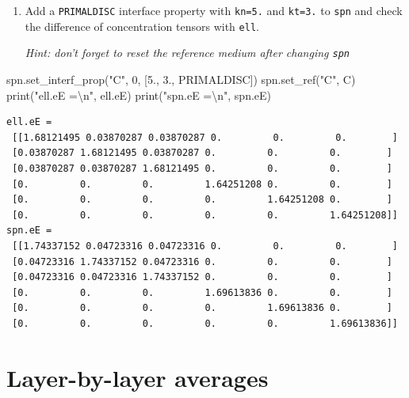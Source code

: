 \documentclass[
  a4paper,
  numbers=noendperiod,
  DIV=12]{scrreprt}
\newenvironment{Shaded}{\begin{snugshade}}{\end{snugshade}}
\newcommand{\BuiltInTok}[1]{#1}
\newcommand{\CharTok}[1]{\textcolor[rgb]{0.31,0.60,0.02}{#1}}
\newcommand{\DecValTok}[1]{\textcolor[rgb]{0.00,0.00,0.81}{#1}}
\newcommand{\FloatTok}[1]{\textcolor[rgb]{0.00,0.00,0.81}{#1}}
\newcommand{\NormalTok}[1]{#1}
\newcommand{\StringTok}[1]{\textcolor[rgb]{0.31,0.60,0.02}{#1}}
\begin{document}
\begin{tcolorbox}
\begin{enumerate}
\def\labelenumi{\arabic{enumi}.}
\setcounter{enumi}{4}
\item
  Add a \texttt{PRIMALDISC} interface property with \texttt{kn=5.} and
  \texttt{kt=3.} to \texttt{spn} and check the difference of
  concentration tensors with \texttt{ell}.

  \emph{Hint: don't forget to reset the reference medium after changing
  \texttt{spn}}
\end{enumerate}

\begin{Shaded}
\begin{Highlighting}[]
\NormalTok{spn.set\_interf\_prop(}\StringTok{"C"}\NormalTok{, }\DecValTok{0}\NormalTok{, [}\FloatTok{5.}\NormalTok{, }\FloatTok{3.}\NormalTok{, PRIMALDISC])}
\NormalTok{spn.set\_ref(}\StringTok{"C"}\NormalTok{, C)}
\BuiltInTok{print}\NormalTok{(}\StringTok{"ell.eE =}\CharTok{\textbackslash{}n}\StringTok{"}\NormalTok{, ell.eE)}
\BuiltInTok{print}\NormalTok{(}\StringTok{"spn.eE =}\CharTok{\textbackslash{}n}\StringTok{"}\NormalTok{, spn.eE)}
\end{Highlighting}
\end{Shaded}

\begin{verbatim}
ell.eE =
 [[1.68121495 0.03870287 0.03870287 0.         0.         0.        ]
 [0.03870287 1.68121495 0.03870287 0.         0.         0.        ]
 [0.03870287 0.03870287 1.68121495 0.         0.         0.        ]
 [0.         0.         0.         1.64251208 0.         0.        ]
 [0.         0.         0.         0.         1.64251208 0.        ]
 [0.         0.         0.         0.         0.         1.64251208]]
spn.eE =
 [[1.74337152 0.04723316 0.04723316 0.         0.         0.        ]
 [0.04723316 1.74337152 0.04723316 0.         0.         0.        ]
 [0.04723316 0.04723316 1.74337152 0.         0.         0.        ]
 [0.         0.         0.         1.69613836 0.         0.        ]
 [0.         0.         0.         0.         1.69613836 0.        ]
 [0.         0.         0.         0.         0.         1.69613836]]
\end{verbatim}

\end{tcolorbox}

\section{Layer-by-layer averages}\label{sec-layer-averages}
\end{document}

